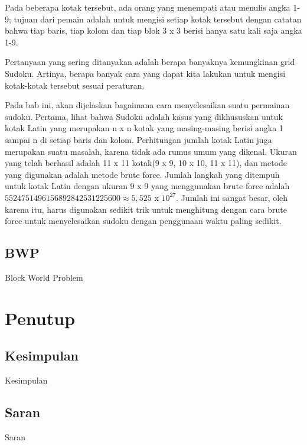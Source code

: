 \documentclass[11pt,a4paper]{report}
\begin{document}
\indent Pada beberapa kotak tersebut, ada orang yang menempati atau menulis angka 1-9; tujuan dari pemain adalah untuk mengisi setiap kotak tersebut dengan catatan bahwa tiap baris, tiap kolom dan tiap blok 3 x 3 berisi hanya satu kali saja angka 1-9.

\indent Pertanyaan yang sering ditanyakan adalah berapa banyaknya kemungkinan grid Sudoku. Artinya, berapa banyak cara yang dapat kita lakukan untuk mengisi kotak-kotak tersebut sesuai peraturan.

\indent Pada bab ini, akan dijelaskan bagaimana cara menyelesaikan suatu permainan sudoku. Pertama, lihat bahwa Sudoku adalah kasus yang dikhususkan untuk kotak Latin yang merupakan n x n kotak yang masing-masing berisi angka 1 sampai n di setiap baris dan kolom. Perhitungan jumlah kotak Latin juga merupakan suatu masalah, karena tidak ada rumus umum yang dikenal. Ukuran yang telah berhasil adalah 11 x 11 kotak(9 x 9, 10 x 10, 11 x 11), dan metode yang digunakan adalah metode brute force. Jumlah langkah yang ditempuh untuk kotak Latin dengan ukuran 9 x 9 yang menggunakan brute force adalah $5524751496156892842531225600 \approx 5,525$ x $10^{27}$. Jumlah ini sangat besar, oleh karena itu, harus digunakan sedikit trik untuk menghitung dengan cara brute force untuk menyelesaikan sudoku dengan penggunaan waktu paling sedikit.

\section{BWP}
Block World Problem

\chapter{Penutup} %
\section{Kesimpulan}
Kesimpulan
\section{Saran}
Saran
\end{document}
